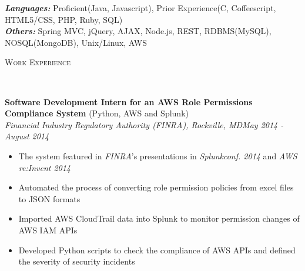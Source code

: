 \documentclass[3pt]{article}
\newenvironment{changemargin}[2]{%
  \begin{list}{}{%
    \setlength{\topsep}{0pt}%
    \setlength{\leftmargin}{#1}%
    \setlength{\rightmargin}{#2}%
    \setlength{\listparindent}{\parindent}%
    \setlength{\itemindent}{\parindent}%
    \setlength{\parsep}{\parskip}%
  }%
  \item[]}{\end{list}
}
\newcommand{\lineover}{
	\begin{changemargin}{-0.05in}{-0.05in}
		\vspace*{-8pt}
		\hrulefill \\
		\vspace*{-2pt}
	\end{changemargin}
}
\newcommand{\header}[1]{
	\begin{changemargin}{-0.5in}{-0.5in}
		{\Large \scshape{#1}}\\
  	\lineover
	\end{changemargin}
}
\newenvironment{body} {
	\vspace*{-16pt}
	\begin{changemargin}{-0.25in}{-0.5in}
  }	
	{\end{changemargin}
}
\begin{document}
\begin{body}
	\vspace{17pt}
	\emph{\textbf{Languages:}}{} Proficient(Java, Javascript), Prior Experience(C, Coffeescript, HTML5/CSS, PHP, Ruby, SQL)\\
    \emph{\textbf{Others:}}{}  Spring MVC, jQuery, AJAX, Node.js, REST,  RDBMS(MySQL), NOSQL(MongoDB), Unix/Linux, AWS\\

\end{body}
\smallskip
\header{Work Experience}

\begin{body}
	\vspace{17pt}
    \textbf{Software Development Intern for an AWS Role Permissions Compliance System} (Python, AWS and Splunk)\\

    \emph{Financial Industry Regulatory Authority (FINRA), Rockville, MD}\hfill \emph{May 2014 - August 2014}\\
     \begin{itemize} \itemsep -0.5pt
    \item{The system featured in \emph{FINRA}'s presentations in \emph{Splunkconf. 2014} and \emph{AWS re:Invent 2014}}
    \item {Automated the process of converting role permission policies from excel files to JSON formats}
    \item {Imported AWS CloudTrail data into Splunk to monitor permission changes of AWS IAM APIs}
   \item{Developed Python scripts to check the compliance of AWS APIs and defined the severity of security incidents}
    \end{itemize}
	

\end{body}
\end{document}
